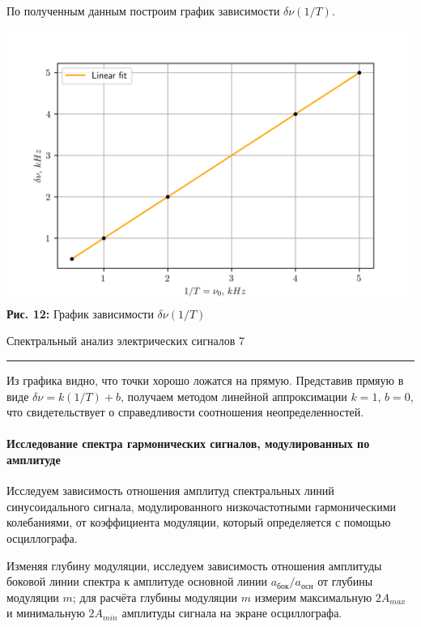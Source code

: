 \documentclass[12pt,a4paper]{scrartcl}
\begin{document}
	По полученным данным построим график зависимости $\delta\nu(1/T)$.
	
		\begin{center}
		\includegraphics[scale=0.75]{PIC_12.png}
		\\\textbf{Рис. 12:} График зависимости $\delta\nu(1/T)$
	\end{center}
	
	\newpage
	
	
	\begin{flushleft}
		\footnotesize{Спектральный анализ электрических сигналов} \hspace{\fill} \footnotesize{7}
		\\[-0.3cm]\noindent\rule{\textwidth}{0.3pt}
	\end{flushleft}
	
	 Из графика видно, что точки хорошо ложатся на прямую. Представив прмяую в виде $\delta\nu = k(1/T) + b$, получаем методом линейной аппроксимации $k = 1$, $b = 0$, что свидетельствует о справедливости соотношения неопределенностей.
	
	
	\paragraph{Исследование спектра гармонических сигналов, модулированных по амплитуде} \hfill
	
	Исследуем зависимость отношения амплитуд спектральных линий синусоидального сигнала, модулированного низкочастотными гармоническими колебаниями,	от коэффициента модуляции, который определяется с помощью осциллографа.
	
	Изменяя глубину модуляции, исследуем зависимость отношения амплитуды боковой линии спектра к амплитуде основной линии $a_{\text{бок}} / a_{\text{осн}}$ от глубины модуляции $m$; для расчёта глубины модуляции $m$ измерим максимальную $2A_{max}$ и минимальную $2A_{min}$ амплитуды сигнала на экране осциллографа.
	
\end{document}
